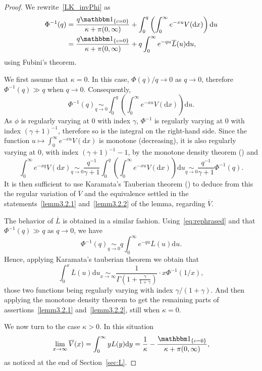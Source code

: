 \documentclass[AHL,Unicode,longabstracts,published]{cedram}
\newcommand{\dd}{\mathrm{d}}
\renewcommand{\bar}[1]{\overline{#1}}
\begin{document}
\begin{proof}
We rewrite~\eqref{LK_invPhi} as
\begin{equation}\label{eq:rephrased}
\begin{split}
\Phi^{-1}(q) &=\frac{q \mathbbm 1_{\{c=0\}}}{\kappa+\pi(0,\infty)}+\int_0^q \left(\int_0^{\infty} e^{-xu}V(\dd x) \right) \dd u\\
&=\frac{q \mathbbm 1_{\{c=0\}}}{\kappa+\pi(0,\infty)}+q\int_0^{\infty}e^{-qu} \bar L(u) \dd u,
\end{split}
\end{equation}
using Fubini's theorem.

We first assume that $\kappa = 0$. In this case, $\Phi(q)/q \to 0$ as $q \to 0$, therefore $\Phi^{-1}(q) \gg q$ when $q \rightarrow 0$. Consequently,
\begin{equation}\label{eq:miseenplace}
\Phi^{-1}(q) \underset{q \rightarrow 0}{\sim} \int_0^q \left(\int_0^{\infty} e^{-xu}V(\dd x) \right) \dd u.
\end{equation}
As $\phi$ is regularly varying at $0$ with index $\gamma$, $\Phi^{-1}$ is regularly varying at $0$ with index $(\gamma+1)^{-1}$, therefore so is the integral on the right-hand side. Since the function $u \mapsto \int_0^{\infty} e^{-xu}V(\dd x)$ is monotone (decreasing), it is also regularly varying at $0$, with index $(\gamma+1)^{-1}-1$, by the monotone density theorem (\cite[Theorem~1.7.2b]{BGT}) and
\[
\int_0^{\infty} e^{-xq}V(\dd x) \underset{q \rightarrow 0}{\sim} \frac{q^{-1}}{\gamma+1} \int_0^q \left(\int_0^{\infty} e^{-xu}V(\dd x) \right) \dd u \underset{q \rightarrow 0}{\sim} \frac{q^{-1}}{\gamma+1} \Phi^{-1}(q).
\]
It is then sufficient to use Karamata's Tauberian theorem (\cite[Theorem~1.7.1]{BGT}) to deduce from this the regular variation of $\bar V$ and the equivalence settled in the statements~\eqref{lemm3.2.1} and~\eqref{lemm3.2.2} of the lemma, regarding $\bar V$.

The behavior of $\bar{L}$ is obtained in a similar fashion. Using~\eqref{eq:rephrased} and that $\Phi^{-1}(q) \gg q$ as $q \to 0$, we have
\[
\Phi^{-1}(q)\underset{q \rightarrow 0}{\sim} q \int_0^{\infty}e^{-qu} \bar{L}(u) \dd u.
\]
Hence, applying Karamata's tauberian theorem we obtain that
\[
\int_0^{x} \bar L(u) \dd u \underset{x \rightarrow \infty}{\sim} \frac{1}{\Gamma\left(1+\frac{\gamma}{1+\gamma}\right)} \cdot x \Phi^{-1}(1/x),
\]
those two functions being regularly varying with index $\gamma/(1+\gamma)$. And then applying the monotone density theorem to get the remaining parts of assertions~\eqref{lemm3.2.1} and~\eqref{lemm3.2.2}, still when $\kappa=0$.

We now turn to the case $\kappa > 0$. In this situation
\[
\lim_{x \to \infty} \bar{V}(x) = \int_0^\infty y L(y) \dd y =\frac{1}{\kappa}- \frac{\mathbbm 1_{\{c=0\}}}{\kappa +\pi(0,\infty)},
\]
as noticed at the end of Section~\ref{sec:L}.
\end{proof}
\end{document}
